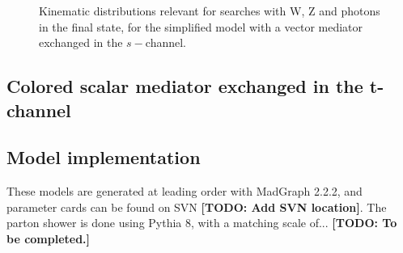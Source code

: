 \begin{figure}[h!]
{    }    
    \hfill
    \caption{Kinematic distributions relevant for searches with W, Z and photons in the final state, 
    for the simplified model with a vector mediator exchanged in the $s-$channel.}
    \label{fig:DMV_EW_kinematics}
\end{figure}

\subsection{Colored scalar mediator exchanged in the t-channel}


\subsection{Model implementation}

These models are generated at leading order with MadGraph 2.2.2, and parameter
cards can be found on SVN \textbf{[TODO: Add SVN location]}.
The parton shower is done using Pythia 8, with a matching scale of... 
\textbf{[TODO: To be completed.]}

